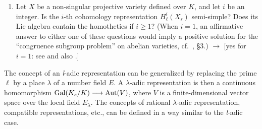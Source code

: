 \begin{enumerate}[label=\arabic*.,leftmargin=2.2em,itemsep=0.15ex,topsep=0.4ex]
\item Let $X$ be a non-singular projective variety defined over $K$,
and let $i$ be an integer.  Is the $i$-th cohomology representation
$H^i_\ell(X_s)$ semi-simple?  Does its Lie algebra contain the
homotheties if $i \geq 1$?  (When $i = 1$, an affirmative answer to
either one of these questions would imply a positive solution for the
``congruence subgroup problem'' on abelian varieties,
cf.~\cite{serre-congr}, \S3.)  $\longrightarrow$ [yes for $i=1$: see
\cite{bogomolov} and also \cite{serre-congr2}.]
\end{enumerate}


The concept of an \textit{l}-adic representation can be generalized by
replacing the prime $\ell$ by a place $\lambda$ of a number field $E$.
A $\lambda$-adic representation is then a continuous homomorphism
$\mathrm{Gal}(K_s/K) \longrightarrow \mathrm{Aut}(V)$, where $V$ is a
finite-dimensional vector space over the local field $E_\lambda$.  The
concepts of rational $\lambda$-adic representation, compatible
representations, etc., can be defined in a way similar to the
\textit{l}-adic case.

